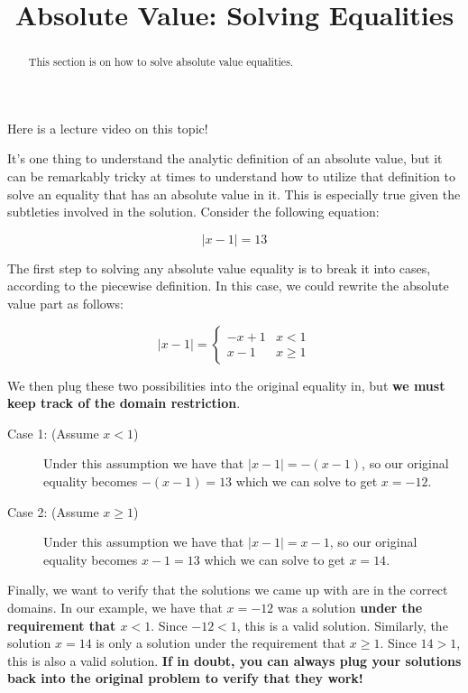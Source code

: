 \documentclass{ximera}
\title{Absolute Value: Solving Equalities}
\begin{document}
\begin{abstract}
    This section is on how to solve absolute value equalities.
\end{abstract}
\maketitle

Here is a lecture video on this topic!


It's one thing to understand the analytic definition of an absolute value, but it can be remarkably tricky at times to understand how to utilize that definition to solve an equality that has an absolute value in it. This is especially true given the subtleties involved in the solution. Consider the following equation:

\[
    |x-1| = 13
\]

The first step to solving any absolute value equality is to break it into cases, according to the piecewise definition. In this case, we could rewrite the absolute value part as follows:

\[
    |x-1| = 
        \begin{cases}
            -x + 1 & x < 1 \\
            x - 1 & x \geq 1
        \end{cases}
\]

We then plug these two possibilities into the original equality in, but \textbf{we must keep track of the domain restriction}. 
\begin{description}
    \item[Case 1: (Assume $x < 1$)] Under this assumption we have that \hbox{$|x-1| = -(x-1)$}, so our original equality becomes $-(x-1) = 13$ which we can solve to get $x = -12$.
    \item[Case 2: (Assume $x \geq 1$)] Under this assumption we have that $|x-1| = x-1$, so our original equality becomes $x-1 = 13$ which we can solve to get $x = 14$.
\end{description}
Finally, we want to verify that the solutions we came up with are in the correct domains. In our example, we have that $x = -12$ was a solution \textbf{under the requirement that $x < 1$}. Since $-12 < 1$, this is a valid solution. Similarly, the solution $x = 14$ is only a solution under the requirement that $x \geq 1$. Since $14 > 1$, this is also a valid solution. \textbf{If in doubt, you can always plug your solutions back into the original problem to verify that they work!}
\end{document}
